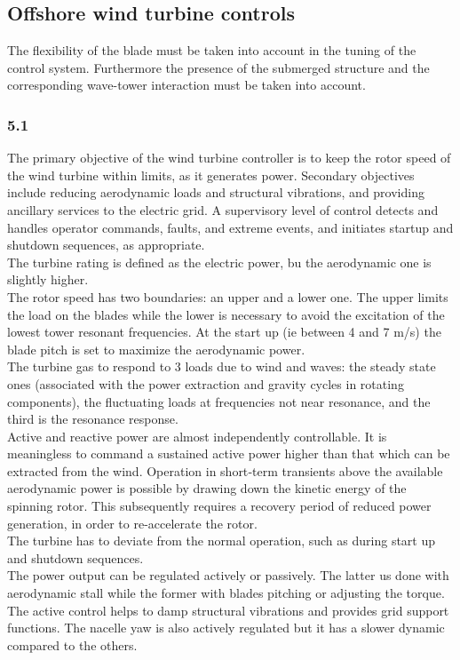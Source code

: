 \documentclass[]{article}
\begin{document}
\subsection{Offshore wind turbine controls}
The flexibility of the blade must be taken into account in the tuning of the control system. Furthermore the presence of the submerged structure and the corresponding wave-tower interaction must be taken into account.
\subsubsection{5.1}
The primary objective of the wind turbine controller is to keep the rotor speed of the wind turbine within limits, as it generates power. Secondary objectives include reducing aerodynamic loads and structural vibrations, and providing ancillary services to the electric grid. A supervisory level of control detects and handles operator commands, faults, and extreme events, and initiates startup and shutdown sequences, as appropriate.\\
The turbine rating is defined as the electric power, bu the aerodynamic one is slightly higher.\\
The rotor speed has two boundaries: an upper and a lower one. The upper limits the load on the blades while the lower is necessary to avoid the excitation of the lowest tower resonant frequencies. At the start up (ie between 4 and 7 m/s) the blade pitch is set to maximize the aerodynamic power.\\
The turbine gas to respond to 3 loads due to wind and waves: the steady state ones (associated with the power extraction and gravity cycles in rotating components), the fluctuating loads at frequencies not near resonance, and the third is the resonance response.\\ 
Active and reactive power are almost independently controllable. It is meaningless to command a sustained active power higher than that which can be extracted from the wind. Operation in short‐term transients above the available aerodynamic power is possible by drawing down the kinetic energy of the spinning rotor. This subsequently requires a recovery period of reduced power generation, in order to re-accelerate the rotor.\\
The turbine has to deviate from the normal operation, such as during start up and shutdown sequences.\\
The power output can be regulated actively or passively. The latter us done with aerodynamic stall while the former with blades pitching or adjusting the torque. The active control helps to damp structural vibrations and provides grid support functions. The nacelle yaw is also actively regulated but it has a slower dynamic compared to the others.
\end{document}
